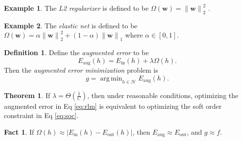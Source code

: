\documentclass[10pt]{exam}
\theoremstyle{definition}
\newtheorem{example}{Example}
\newtheorem{defn}{Definition}
\newtheorem{fact}{Fact}
\newtheorem{theorem}{Theorem}
\DeclareMathOperator*{\argmin}{arg\,min}
\newcommand{\Ein}{E_{\text{in}}}
\newcommand{\Eout}{E_{\text{out}}}
\newcommand{\Eaug}{E_{\text{aug}}}
\newcommand{\w}{\mathbf w}
\newcommand{\lone}[1]{{\lVert {#1} \rVert}_1}
\newcommand{\ltwo}[1]{{\lVert {#1} \rVert}_2}
\begin{document}
\begin{example}
    The \emph{L2 regularizer} is defined to be
    $
        \Omega(\w) = \ltwo{\w}^2
        $
        .
\end{example}

\begin{example}
    The \emph{elastic net} is defined to be
    $
        \Omega(\w) = \alpha \ltwo{\w}^2 + (1-\alpha) \lone{\w}
        $
    where $\alpha \in [0,1]$.
\end{example}


\newpage
\begin{defn}
Define the \emph{augmented error} to be
\begin{equation}
    \Eaug(h) = \Ein(h) + \lambda\Omega(h)
    .
\end{equation}
    Then the \emph{augmented error minimization} problem is
\begin{equation}
    \label{eq:rlm}
    g = \argmin_{h\in\mathcal H} \Eaug(h)
    .
\end{equation}
\end{defn}

\begin{theorem}
    If $\lambda = \Theta(\tfrac 1C)$, then under reasonable conditions, optimizing the augmented error in Eq \eqref{eq:rlm} is equivalent to optimizing the soft order constraint in Eq \eqref{eq:soc}.
\end{theorem}

\begin{fact}
    If $\Omega(h) \approx |\Ein(h) - \Eout(h)|$,
    then $\Eaug \approx \Eout$,
    and $g\approx f$.
\end{fact}
\end{document}

